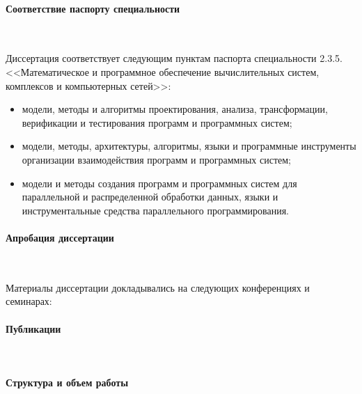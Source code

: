 

\paragraph{Соответствие паспорту специальности} \

Диссертация соответствует следующим пунктам паспорта специальности 2.3.5. <<Математическое и программное обеспечение вычислительных систем, комплексов и компьютерных сетей>>:
\begin{itemize}
\item модели, методы и алгоритмы проектирования, анализа, трансформации, верификации и тестирования программ и программных систем;
\item модели, методы, архитектуры, алгоритмы, языки и программные инструменты организации взаимодействия программ и программных систем;
\item модели и методы создания программ и программных систем для параллельной и распределенной обработки данных, языки и инструментальные средства параллельного программирования.
\end{itemize}

\paragraph{Апробация диссертации} \

Материалы диссертации докладывались на следующих конференциях и семинарах:
\begin{itemize}

\end{itemize}



\paragraph{Публикации} \



\paragraph{Структура и объем работы} \




